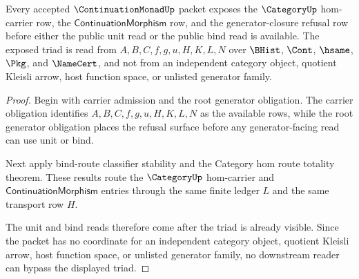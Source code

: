 \begin{theorem}
\label{thm:continuation-monad-category-generator-source-triad}
Every accepted $\ContinuationMonadUp$ packet exposes the $\CategoryUp$ hom-carrier row, the $\mathsf{ContinuationMorphism}$ row, and the generator-closure refusal row before either the public unit read or the public bind read is available. The exposed triad is read from $A,B,C,f,g,u,H,K,L,N$ over $\BHist$, $\Cont$, $\hsame$, $\Pkg$, and $\NameCert$, and not from an independent category object, quotient Kleisli arrow, host function space, or unlisted generator family.
\end{theorem}
\begin{proof}
Begin with carrier admission and the root generator obligation. The carrier obligation identifies $A,B,C,f,g,u,H,K,L,N$ as the available rows, while the root generator obligation places the refusal surface before any generator-facing read can use unit or bind.

Next apply bind-route classifier stability and the Category hom route totality theorem. These results route the $\CategoryUp$ hom-carrier and $\mathsf{ContinuationMorphism}$ entries through the same finite ledger $L$ and the same transport row $H$.

The unit and bind reads therefore come after the triad is already visible. Since the packet has no coordinate for an independent category object, quotient Kleisli arrow, host function space, or unlisted generator family, no downstream reader can bypass the displayed triad.
\end{proof}

